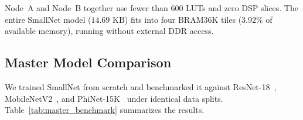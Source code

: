 \documentclass[conference]{IEEEtran}
\begin{document}
\begin{table}[h]
\centering
\caption{FPGA Hardware Resource Utilization (AMD Zynq-7020)}
\label{tab:hardware_resources}
\end{table}

Node~A and Node~B together use fewer than 600 LUTs and zero DSP slices. The entire SmallNet model ($14.69\text{ KB}$) fits into four BRAM36K tiles ($3.92\%$ of available memory), running without external DDR access.

\subsection{Master Model Comparison}
We trained SmallNet from scratch and benchmarked it against ResNet-18~\cite{he2016deep}, MobileNetV2~\cite{sandler2018mobilenetv2}, and PhiNet-15K~\cite{paissan2022phinets} under identical data splits. Table~\ref{tab:master_benchmark} summarizes the results.
\end{document}
